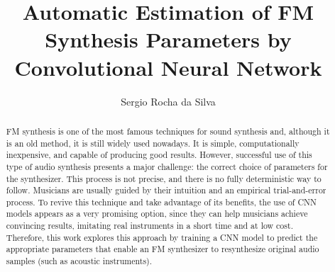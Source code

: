 \documentclass[sigconf,natbib=false]{acmart}
\begin{document}
\title{Automatic Estimation of FM Synthesis Parameters by Convolutional Neural Network}
\renewcommand{\shorttitle}{Hope it is}

\author{Sergio Rocha da Silva}

\renewcommand{\shortauthors}{B. Trovato et al.}

\begin{abstract}
  FM synthesis is one of the most famous techniques for sound synthesis and, although it is an old method, it is still widely used nowadays. It is simple, computationally inexpensive, and capable of producing good results. However, successful use of this type of audio synthesis presents a major challenge: the correct choice of parameters for the synthesizer. This process is not precise, and there is no fully deterministic way to follow. Musicians are usually guided by their intuition and an empirical trial-and-error process. To revive this technique and take advantage of its benefits, the use of CNN models appears as a very promising option, since they can help musicians achieve convincing results, imitating real instruments in a short time and at low cost. Therefore, this work explores this approach by training a CNN model to predict the appropriate parameters that enable an FM synthesizer to resynthesize original audio samples (such as acoustic instruments).
\end{abstract}
\end{document}
